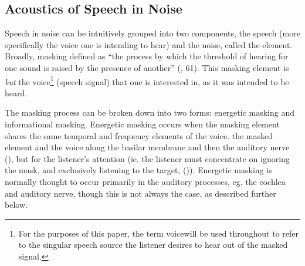 \subsection{Acoustics of Speech in Noise}
\label{bkgrnd:speech_in_noise}

Speech in noise can be intuitively grouped into two components, the speech (more specifically the voice one is intending to hear) and the noise, called the \DIFdelbegin {}\DIFdelend \DIFaddbegin {}\DIFaddend element.  Broadly, masking \DIFdelbegin {}\DIFdelend \DIFaddbegin {}\DIFaddend defined as ``the process by which the threshold of hearing for one sound is raised by the presence of another'' (\cite{ansi:13}, 61).  This masking element is \DIFdelbegin {}\DIFdelend \DIFaddbegin {}\DIFaddend \textit{but} the voice\footnote{For the purposes of this paper, the term \DIFdelbegin {}\DIFdelend \DIFaddbegin {}\DIFaddend voice\DIFdelbegin {}\DIFdelend \DIFaddbegin {}\DIFaddend will be used throughout to refer to the singular speech source the listener desires to hear out of the masked signal.} (speech signal) that one is interested in, as it was intended to be heard.

The masking process can be broken down into two forms: energetic masking and informational masking.  Energetic masking occurs when the masking element shares the same temporal and frequency elements of the voice.  \DIFdelbegin {}\DIFdelend \DIFaddbegin {}\DIFaddend the masked element and the voice \DIFdelbegin {}\DIFdelend \DIFaddbegin {}\DIFaddend along the basilar membrane and then the auditory nerve (\cite{brungart:01}), but \DIFdelbegin {}\DIFdelend \DIFaddbegin {}\DIFaddend for the listener's attention (ie. the listener must concentrate on ignoring the mask, and exclusively listening to the target, (\cite{mattys:12})).  Energetic masking is normally thought to occur primarily in the \DIFdelbegin {}\DIFdelend \DIFaddbegin {}\DIFaddend auditory processes, eg. the cochlea and auditory nerve, though this is not always the case, as described further below.  

